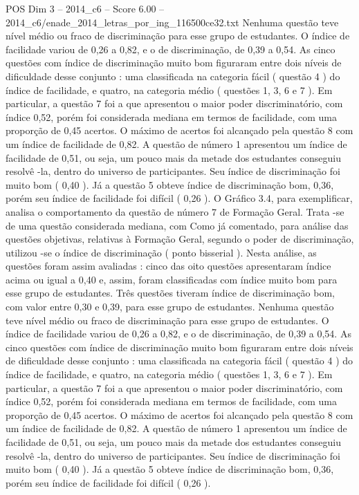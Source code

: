 \begin{textsample}{POS Dim 3 – 2014\_c6 – Score 6.00 – 2014\_c6/enade\_2014\_letras\_por\_ing\_116500ce32.txt}
Nenhuma questão teve nível médio ou fraco de discriminação para esse grupo de estudantes.
O índice de facilidade variou de 0,26 a 0,82, e o de discriminação, de 0,39 a 0,54.
As cinco questões com índice de discriminação muito bom figuraram entre dois níveis de dificuldade desse conjunto : uma classificada na categoria fácil ( questão 4 ) do índice de facilidade, e quatro, na categoria médio ( questões 1, 3, 6 e 7 ).
Em particular, a questão 7 foi a que apresentou o maior poder discriminatório, com índice 0,52, porém foi considerada mediana em termos de facilidade, com uma proporção de 0,45 acertos.
O máximo de acertos foi alcançado pela questão 8 com um índice de facilidade de 0,82.
A questão de número 1 apresentou um índice de facilidade de 0,51, ou seja, um pouco mais da metade dos estudantes conseguiu resolvê -la, dentro do universo de participantes.
Seu índice de discriminação foi muito bom ( 0,40 ).
Já a questão 5 obteve índice de discriminação bom, 0,36, porém seu índice de facilidade foi difícil ( 0,26 ).
O Gráfico 3.4, para exemplificar, analisa o comportamento da questão de número 7 de Formação Geral.
Trata -se de uma questão considerada mediana, com Como já comentado, para análise das questões objetivas, relativas à Formação Geral, segundo o poder de discriminação, utilizou -se o índice de discriminação ( ponto bisserial ).
Nesta análise, as questões foram assim avaliadas : cinco das oito questões apresentaram índice acima ou igual a 0,40 e, assim, foram classificadas com índice muito bom para esse grupo de estudantes.
Três questões tiveram índice de discriminação bom, com valor entre 0,30 e 0,39, para esse grupo de estudantes.
Nenhuma questão teve nível médio ou fraco de discriminação para esse grupo de estudantes.
O índice de facilidade variou de 0,26 a 0,82, e o de discriminação, de 0,39 a 0,54.
As cinco questões com índice de discriminação muito bom figuraram entre dois níveis de dificuldade desse conjunto : uma classificada na categoria fácil ( questão 4 ) do índice de facilidade, e quatro, na categoria médio ( questões 1, 3, 6 e 7 ).
Em particular, a questão 7 foi a que apresentou o maior poder discriminatório, com índice 0,52, porém foi considerada mediana em termos de facilidade, com uma proporção de 0,45 acertos.
O máximo de acertos foi alcançado pela questão 8 com um índice de facilidade de 0,82.
A questão de número 1 apresentou um índice de facilidade de 0,51, ou seja, um pouco mais da metade dos estudantes conseguiu resolvê -la, dentro do universo de participantes.
Seu índice de discriminação foi muito bom ( 0,40 ).
Já a questão 5 obteve índice de discriminação bom, 0,36, porém seu índice de facilidade foi difícil ( 0,26 ).

\end{textsample}
